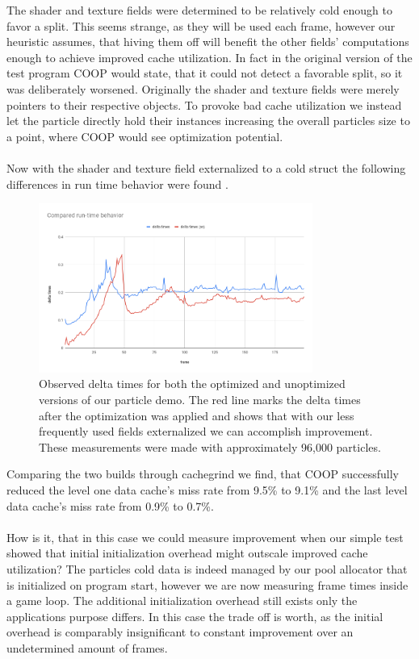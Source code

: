 The shader and texture fields were determined to be relatively cold enough to favor a split. This seems strange, as they will be used each frame, however our heuristic assumes, that hiving them off will benefit the other fields' computations enough to achieve improved cache utilization. In fact in the original version of the test program COOP would state, that it could not detect a favorable split, so it was deliberately worsened. Originally the shader and texture fields were merely pointers to their respective objects. To provoke bad cache utilization we instead let the particle directly hold their instances increasing the overall particles size to a point, where COOP would see optimization potential.\\\\
Now with the shader and texture field externalized to a cold struct the following differences in run time behavior were found .
\begin{figure}[!htbp]
	\centering
	\includegraphics[width=0.8\textwidth,height=0.6\textwidth]{PICs/delta_times}
	\caption{Observed delta times for both the optimized and unoptimized versions of our particle demo. The red line marks the delta times after the optimization was applied and shows that with our less frequently used fields externalized we can accomplish improvement. These measurements were made with approximately 96,000 particles.}
	\label{delta_times}
\end{figure}
Comparing the two builds through cachegrind we find, that COOP successfully reduced the level one data cache's miss rate from 9.5\% to 9.1\% and the last level data cache's miss rate from 0.9\% to 0.7\%.\\\\
How is it, that in this case we could measure improvement when our simple test showed that initial initialization overhead might outscale improved cache utilization? The particles cold data is indeed managed by our pool allocator that is initialized on program start, however we are now measuring frame times inside a game loop. The additional initialization overhead still exists only the applications purpose differs. In this case the trade off is worth, as the initial overhead is comparably insignificant to constant improvement over an undetermined amount of frames.\\\\
